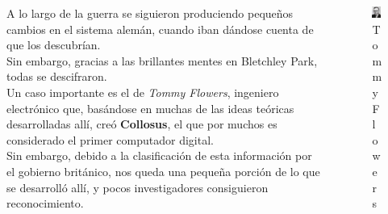 \documentclass[aspectratio=169]{beamer}
\begin{document}
\begin{frame}
	\begin{columns}
		\begin{column}{0.6\linewidth}
			A lo largo de la guerra se siguieron produciendo pequeños cambios en el sistema alemán, cuando iban dándose cuenta de que los descubrían.\\
			Sin embargo, gracias a las brillantes mentes en Bletchley Park, todas se descifraron.\\
			Un caso importante es el de \textit{Tommy Flowers}, ingeniero electrónico que, basándose en muchas de las ideas teóricas desarrolladas allí, creó \textbf{Collosus}, el que por muchos es considerado el primer computador digital.\\
			Sin embargo, debido a la clasificación de esta información por el gobierno británico, nos queda una pequeña porción de lo que se desarrolló allí, y pocos investigadores consiguieron reconocimiento.
		\end{column}
	
		\begin{column}{0.4\linewidth}
			\begin{figure}
			\centering
			\includegraphics[width=0.7\linewidth]{"pic/Tommy Flowers"}
			\caption{Tommy Flowers}
			\end{figure}
		\end{column}
	\end{columns}
	
\end{frame}
\end{document}
